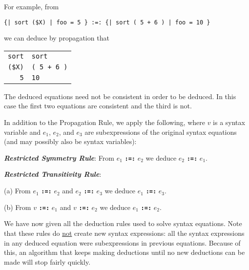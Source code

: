 \documentclass[12pt]{article}
\newcommand{\TT}[1]{{\tt \bfseries #1}}
\newcommand{\ikey}[2]{{\bf \em #1}\index{#2}}
\newenvironment{indpar}[1][0.3in]%
	{\begin{list}{}%
		     {\setlength{\itemsep}{0in}%
		      \setlength{\topsep}{0in}%
		      \setlength{\parsep}{1ex}%
		      \setlength{\labelwidth}{#1}%
		      \setlength{\leftmargin}{#1}%
		      \addtolength{\leftmargin}{\labelsep}}%
	 \item}%
	{\end{list}}
\begin{document}
For example, from

\begin{center}
\verb/{| sort ($X) | foo = 5 } :=: {| sort ( 5 + 6 ) | foo = 10 }/
\end{center}

we can deduce by propagation that

\begin{center}
\begin{tabular}{r@\TT{~:=:~}l}
\verb/sort/ & \verb/sort/ \\
\verb/($X)/ & \verb/( 5 + 6 )/ \\
\verb/5/ & \verb/10/
\end{tabular}
\end{center}

The deduced equations need not be consistent in order to be deduced.
In this case the first two equations are consistent and the third is not.

In addition to the Propagation Rule, we apply the following, where
$v$ is a syntax variable and
$e_1$, $e_2$, and $e_3$ are subexpressions of the original
syntax equations (and may possibly also be syntax variables):

\begin{indpar}
\begin{list}{}{}
\item [\ikey{Restricted Symmetry Rule}{restricted!symmetry rule}:]%
\label{RESTRICTED-SYMMETRY-RULE}
From $e_1$ \TT{:=:} $e_2$ we deduce $e_2$ \TT{:=:} $e_1$.

\item [\ikey{Restricted Transitivity Rule}{restricted!transitivity rule}:]%
\label{RESTRICTED-TRANSITIVITY-RULE} ~\\
\vspace*{-2ex}
\begin{list}{}{}
\item[(a)]
From $e_1$ \TT{:=:} $e_2$ and $e_2$ \TT{:=:} $e_3$
we deduce $e_1$ \TT{:=:} $e_3$.

\item[(b)]
From $v$ \TT{:=:} $e_1$ and $v$ \TT{:=:} $e_2$
we deduce $e_1$ \TT{:=:} $e_2$.
\end{list}

\end{list}
\end{indpar}

We have now given all the deduction rules used to solve syntax equations.
Note that these rules do \underline{not} create new syntax expressions:
all the syntax expressions in any deduced equation were subexpressions
in previous equations.  Because of this,
an algorithm that keeps making deductions until
no new deductions can be made will stop fairly quickly.
\end{document}
